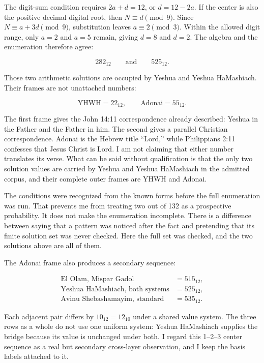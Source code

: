 The digit-sum condition requires $2a+d=12$, or $d=12-2a$. If the center is also the positive decimal digital root, then $N\equiv d\pmod 9$. Since $N\equiv a+3d\pmod 9$, substitution leaves $a\equiv2\pmod 3$. Within the allowed digit range, only $a=2$ and $a=5$ remain, giving $d=8$ and $d=2$. The algebra and the enumeration therefore agree:

\[
\boxed{282_{12}}
\qquad\text{and}\qquad
\boxed{525_{12}}.
\]

Those two arithmetic solutions are occupied by Yeshua and Yeshua HaMashiach. Their frames are not unattached numbers:

\[
\text{YHWH}=22_{12},
\qquad
\text{Adonai}=55_{12}.
\]

The first frame gives the John 14:11 correspondence already described: Yeshua in the Father and the Father in him. The second gives a parallel Christian correspondence. Adonai is the Hebrew title ``Lord,'' while Philippians 2:11 confesses that Jesus Christ is Lord. I am not claiming that either number translates its verse. What can be said without qualification is that the only two solution values are carried by Yeshua and Yeshua HaMashiach in the admitted corpus, and their complete outer frames are YHWH and Adonai.

The conditions were recognized from the known forms before the full enumeration was run. That prevents me from treating two out of 132 as a prospective probability. It does not make the enumeration incomplete. There is a difference between saying that a pattern was noticed after the fact and pretending that its finite solution set was never checked. Here the full set was checked, and the two solutions above are all of them.

The Adonai frame also produces a secondary sequence:

\begin{align*}
\text{El Olam, Mispar Gadol} &= 515_{12},\\
\text{Yeshua HaMashiach, both systems} &= 525_{12},\\
\text{Avinu Shebashamayim, standard} &= 535_{12}.
\end{align*}

Each adjacent pair differs by $10_{12}=12_{10}$ under a shared value system. The three rows as a whole do not use one uniform system: Yeshua HaMashiach supplies the bridge because its value is unchanged under both. I regard this 1--2--3 center sequence as a real but secondary cross-layer observation, and I keep the basis labels attached to it.

